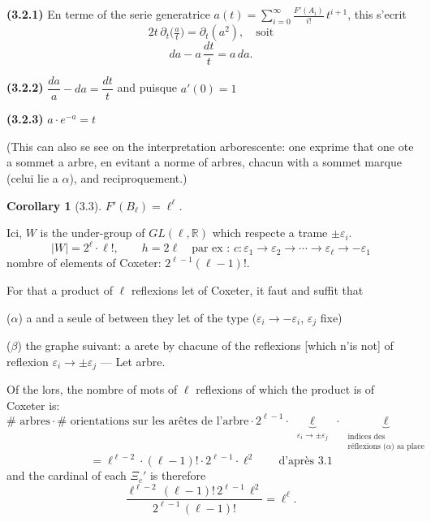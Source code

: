 \documentclass[11pt,a4paper]{article}
\theoremstyle{plain}
\newtheorem{corollary}[theorem]{Corollary}
\theoremstyle{definition}
\begin{document}
\smallskip

\noindent
\textbf{(3.2.1)} En terme of the serie generatrice $\displaystyle a(t) = \sum_{i=0}^{\infty} \frac{F'(A_i)}{i!}\, t^{i+1}$, this s'ecrit
\[
2t \, \partial_t\bigl(\tfrac{a}{t}\bigr) = \partial_t(a^2), \quad \text{soit}
\]
\[
da - a\,\frac{dt}{t} = a\, da.
\]

\smallskip

\noindent
\textbf{(3.2.2)} $\dfrac{da}{a} - da = \dfrac{dt}{t}$ \quad and puisque $a'(0) = 1$

\smallskip

\noindent
\textbf{(3.2.3)} $a \cdot e^{-a} = t$

\smallskip

\noindent
(This can also se see on the interpretation arborescente: one exprime that one ote a sommet a arbre, en evitant a norme of arbres, chacun with a sommet marque (celui lie a $\alpha$), and reciproquement.)

\newpage

\begin{corollary}[3.3]
$F'(B_\ell) = \ell^\ell$.
\end{corollary}

Ici, $W$ is the under-group of $GL(\ell, \mathbb{R})$ which respecte a trame $\pm\varepsilon_i$.
\[
|W| = 2^\ell \cdot \ell!, \qquad h = 2\ell \quad \text{par ex : } c : \varepsilon_1 \to \varepsilon_2 \to \cdots \to \varepsilon_\ell \to -\varepsilon_1
\]
nombre of elements of Coxeter: $2^{\ell-1} (\ell-1)!$.

For that a product of $\ell$ reflexions let of Coxeter, it faut and suffit that

\smallskip

\noindent
($\alpha$) a and a seule of between they let of the type $(\varepsilon_i \to -\varepsilon_i$, $\varepsilon_j$ fixe)

\smallskip

\noindent
($\beta$) the graphe suivant: a arete by chacune of the reflexions [which n'is not] of reflexion $\varepsilon_i \to \pm\varepsilon_j$ --- Let arbre.

\smallskip

Of the lors, the nombre of mots of $\ell$ reflexions of which the product is of Coxeter is:
\[
\# \text{ arbres} \cdot \# \text{ orientations sur les ar\^etes de l'arbre} \cdot 2^{\ell-1} \cdot \underbrace{\ell}_{\substack{\varepsilon_i \to \pm\varepsilon_j}} \cdot \underbrace{\ell}_{\substack{\text{indices des} \\ \text{r\'eflexions ($\alpha$) sa place}}}
\]
\[
= \ell^{\ell-2} \cdot (\ell-1)! \cdot 2^{\ell-1} \cdot \ell^2 \qquad \text{d'apr\`es 3.1}
\]
and the cardinal of each $\Xi_c'$ is therefore
\[
\frac{\ell^{\ell-2}\, (\ell-1)! \, 2^{\ell-1}\, \ell^2}{2^{\ell-1}\, (\ell-1)!} = \ell^\ell.
\]
\end{document}

